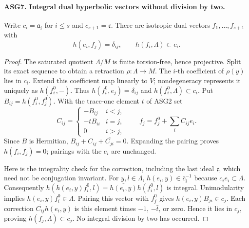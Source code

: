 \documentclass[11pt,a4paper]{article}
\numberwithin{equation}{section}
\theoremstyle{remark}\newtheorem{remark}[theorem]{Remark}
\begin{document}
\paragraph{ASG7. Integral dual hyperbolic vectors without division by two.}
\label{claim:ASG7}
Write \(c_i=\mathfrak a_i\) for \(i\le s\) and
\(c_{s+1}=\mathfrak c\).  There are isotropic dual vectors
\(f_1,\ldots,f_{s+1}\) with
\[
       h(e_i,f_j)=\delta_{ij},\qquad h(f_i,\Lambda)\subset c_i.
\tag{ASG.7}
\]
\begin{proof}
The saturated quotient \(\Lambda/M\) is finite torsion-free,
hence projective.  Split its exact sequence to obtain a retraction
\(\rho:\Lambda\to M\).  The \(i\)-th coefficient of
\(\rho(y)\) lies in \(c_i\).  Extend this coefficient map
linearly to \(V\); nondegeneracy represents it uniquely as
\(h(f_i^0,-)\).  Thus
\(h(f_i^0,e_j)=\delta_{ij}\) and
\(h(f_i^0,\Lambda)\subset c_i\).
Put \(B_{ij}=h(f_i^0,f_j^0)\).  With the trace-one element
\(t\) of ASG2 set
\[
 C_{ij}=\begin{cases}-B_{ij}&i<j,\\-tB_{ii}&i=j,\\0&i>j,
              \end{cases}
 \qquad f_j=f_j^0+\sum_i C_{ij}e_i.
\tag{ASG.8}
\]
Since \(B\) is Hermitian,
\(B_{ij}+C_{ij}+\overline{C_{ji}}=0\).
Expanding the pairing proves \(h(f_i,f_j)=0\); pairings with
the \(e_i\) are unchanged.

Here is the integrality check for the correction, including the last
ideal \(\mathfrak c\), which need not be conjugation invariant.
For \(y,l\in\Lambda\),
\(h(e_i,y)\in\bar c_i^{-1}\) because \(c_i e_i\subset\Lambda\).
Consequently
\(h(h(e_i,y)f_i^0,l)=\overline{h(e_i,y)}h(f_i^0,l)\)
is integral.  Unimodularity implies
\(h(e_i,y)f_i^0\in\Lambda\).  Pairing this vector with
\(f_j^0\) gives \(h(e_i,y)B_{ji}\in c_j\).
Each correction \(\overline{C_{ij}}h(e_i,y)\) is this element
times \(-1\), \(-\bar t\), or zero.  Hence it lies in
\(c_j\), proving \(h(f_j,\Lambda)\subset c_j\).
No integral division by two has occurred.
\end{proof}

\end{document}
